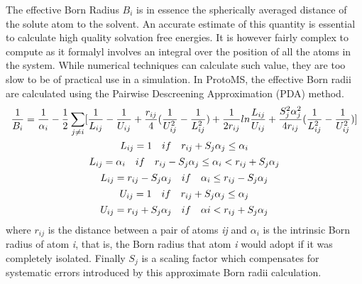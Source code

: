 \documentclass[letterpaper,10pt,english]{sphinxmanual}
\begin{document}
The effective Born Radius \(B_{i}\) is in essence the spherically averaged distance of the solute atom to the solvent. An accurate estimate of this quantity is essential to calculate high quality solvation free energies. It is however fairly complex to compute as it formalyl involves an integral over the position of all the atoms in the system. While numerical techniques can calculate such value, they are too slow to be of practical use in a simulation. In ProtoMS, the effective Born radii are calculated using the Pairwise Descreening Approximation (PDA) method.
\begin{gather}
\begin{split}{\frac{1}{B_i}} = \frac{1}{\alpha _{i}} - \frac{1}{2} \sum_{j \not= i} \lbrack \frac{1}{L_{ij}}-\frac{1}{U_{ij}}+\frac{r_{ij}}{4}(\frac{1}{U_{ij}^{2}}-\frac{1}{L_{ij}^{2}}) +\frac{1}{2r_{ij}}ln\frac{L_{ij}}{U_{ij}} + \frac{S_{j}^{2}\alpha_{j}^{2}}{4r_{ij}}(\frac{1}{L_{ij}^{2}}-\frac{1}{U_{ij}^{2}} ) \rbrack\end{split}\notag\\\begin{split}L_{ij} &= 1 \quad if \quad r_{ij} + S_{j}\alpha_{j} \leq \alpha_{i} \\\end{split}\notag\\\begin{split}L_{ij} &= \alpha_{i} \quad if \quad r_{ij} - S_{j}\alpha_{j} \leq \alpha_{i}  <r_{ij} + S_{j}\alpha_{j}\\\end{split}\notag\\\begin{split}L_{ij} &= r_{ij} - S_{j}\alpha_{j} \quad if \quad \alpha_{i} \leq r_{ij} - S_{j}\alpha_{j}\\\end{split}\notag\\\begin{split}U_{ij} &= 1 \quad if \quad  r_{ij} + S_{j}\alpha_{j} \leq \alpha_{j}\\\end{split}\notag\\\begin{split}U_{ij} &= r_{ij} + S_{j}\alpha_{j} \quad if \quad \alpha{i} <  r_{ij} + S_{j}\alpha_{j}\\\end{split}\notag
\end{gather}
where \(r_{ij}\) is the distance between a pair of atoms \emph{ij} and \(\alpha_{i}\) is the intrinsic Born radius of atom \emph{i}, that is, the Born radius that atom \emph{i} would adopt if it was completely isolated. Finally \(S_{j}\) is a scaling factor which compensates for systematic errors introduced by this approximate Born radii calculation.
\end{document}

